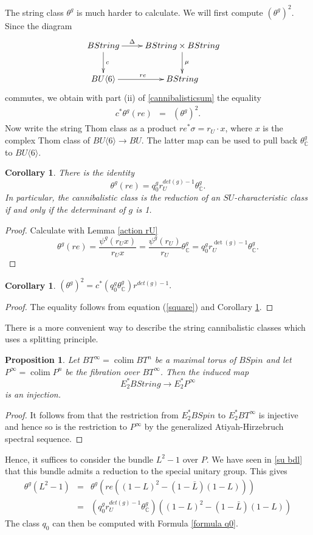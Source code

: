 \documentclass{amsart}
\DeclareMathOperator*{\colim}{colim}
\newcommand {\C}{{\mathbb C}}
\newcommand{\lra}{\longrightarrow}              %
\numberwithin{equation}{section}
\newtheorem{prop}[thm]{Proposition}
\newtheorem{cor}[thm]{Corollary}
\theoremstyle{definition}  %
\newtheorem{set theory}[thm]{Set Theoretic Prelude}
\begin{document}
The string class $\theta^g$ is much harder to calculate. 
We will first compute $(\theta^g)^2$.
Since the diagram
\begin{eqnarray}\label{}
&\xymatrix{
BString
\ar[r]^-{\Delta}\ar[d]^{c}
&
BString \times BString
\ar[d]^\mu
\\
BU\langle 6 \rangle 
\ar[r]^{re}
&
BString
}&
\end{eqnarray}
commutes, we obtain with part (ii) of \ref{cannibalisticsum} the equality
\begin{eqnarray}\label{square}
c^*\theta^{g}(re)&=&(\theta^g)^2.
\end{eqnarray}
Now write the string Thom class as a product $re^*\sigma=r_U\cdot x$, where
$x$ is the complex Thom class of $BU\langle 6\rangle \to BU$. The latter map can be used to pull back $\theta_\C^{g}$ to 
$BU\langle 6\rangle$.
\begin{cor} There is the identity
\label{Cor4.4}$$\theta^g (re) = q_0^g r_U^{det(g)-1}\theta_\C^g.$$
In particular, the cannibalistic class is the reduction of an $SU$-characteristic class if and only if the determinant of $g$ is 1.
\end{cor}
\begin{proof}
Calculate with Lemma \ref{action rU}
$$\theta^{g}(re)=\frac{\psi^{g}(r_Ux)}{r_Ux}=\frac{\psi^{g}(r_U)}{r_U}\theta_\C^{g}=q_0^g r_U^{\det (g)-1}\theta_\C^{g}.$$

\end{proof}
\begin{cor} \label{realmain}
$(\theta^g)^2  = c^*(q_0^g\theta_\C^g) r^{{det(g)-1}}.$
\end{cor}
\begin{proof}
The equality follows from equation (\ref{square}) and Corollary \ref{Cor4.4}.
\end{proof}
There is a more convenient way to describe the string cannibalistic classes which uses a splitting principle. 
\begin{prop}
Let $BT^\infty=\colim BT^n$ be a maximal torus of $BSpin$ and let 
$P^\infty = \colim P^n$ be the fibration over $BT^\infty$.
Then the induced map
$$ E_2^*BString  \lra  E_2^*P^\infty$$
is an injection.
\end{prop}
\begin{proof}
It follows from \cite[Corollary 3.8]{MR3471093} that the restriction from $E_2^*BSpin $ to $E_2^*BT^\infty$ is injective and hence so is the restriction to $P^\infty$ by the generalized Atiyah-Hirzebruch spectral sequence.
\end{proof}
Hence, it suffices to consider the bundle $L^2-1$ over $P$. 
We have seen in \ref{su bdl} that this bundle admits a reduction to the special unitary group. This gives
\begin{eqnarray}\label{Formula 4.5}
\theta^g(L^2-1)&=&\theta^g(re((1-L)^2-(1-\bar{L})(1-L)))\\
&=& (q_0^g r_U^{det(g)-1}\theta_\C^g)((1-L)^2-(1-\bar{L})(1-L))
\end{eqnarray}
The class $q_0$ can then be computed with  Formula \ref{formula q0}.
\end{document}

